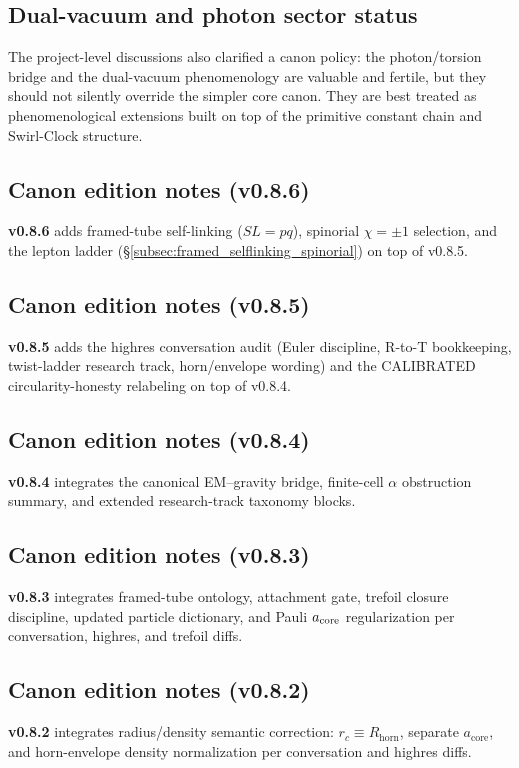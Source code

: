 \documentclass[11pt]{article}
\theoremstyle{definition}
\theoremstyle{plain}
\theoremstyle{remark}
\newcommand{\rc}{{r_c}}
\begin{document}
        \subsection{Dual-vacuum and photon sector status}
            The project-level discussions also clarified a canon policy: the photon/torsion bridge and the dual-vacuum phenomenology are valuable and fertile, but they should not silently override the simpler core canon. They are best treated as phenomenological extensions built on top of the primitive constant chain and Swirl-Clock structure.

        \subsection{Canon edition notes (v0.8.6)}
            \textbf{v0.8.6} adds framed-tube self-linking ($SL=pq$), spinorial $\chi=\pm1$ selection, and the lepton ladder (\S\ref{subsec:framed_selflinking_spinorial}) on top of v0.8.5.

        \subsection{Canon edition notes (v0.8.5)}
            \textbf{v0.8.5} adds the highres conversation audit (Euler discipline, R-to-T bookkeeping, twist-ladder research track, horn/envelope wording) and the CALIBRATED circularity-honesty relabeling on top of v0.8.4.

        \subsection{Canon edition notes (v0.8.4)}
            \textbf{v0.8.4} integrates the canonical EM--gravity bridge, finite-cell $\alpha$ obstruction summary, and extended research-track taxonomy blocks.

        \subsection{Canon edition notes (v0.8.3)}
            \textbf{v0.8.3} integrates framed-tube ontology, attachment gate, trefoil closure discipline, updated particle dictionary, and Pauli $a_{\rm core}$ regularization per conversation, highres, and trefoil diffs.

        \subsection{Canon edition notes (v0.8.2)}
            \textbf{v0.8.2} integrates radius/density semantic correction: $\rc \equiv R_{\mathrm{horn}}$, separate $a_{\mathrm{core}}$, and horn-envelope density normalization per conversation and highres diffs.
\end{document}

